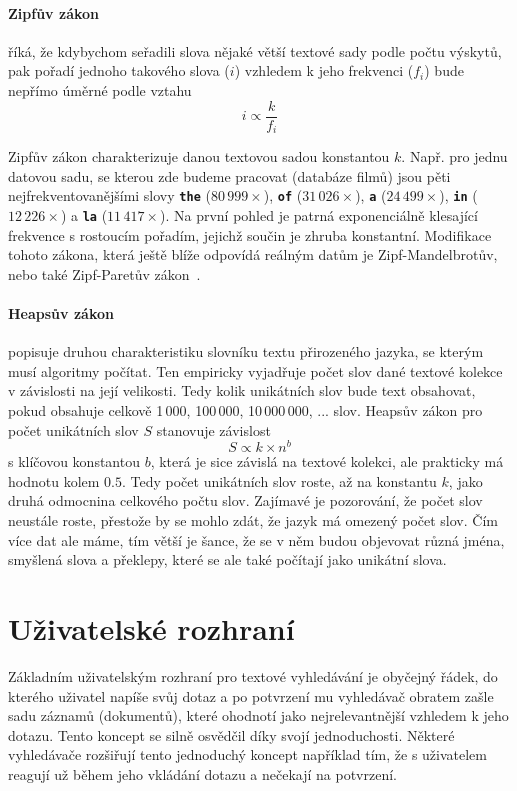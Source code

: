 \documentclass[11pt,letterpaper,oneside,openright]{book}
\newcommand{\bftt}[1]{\texttt{\textbf{#1}}}
\begin{document}
\paragraph{Zipfův zákon} říká, že kdybychom seřadili slova nějaké větší textové
sady podle počtu výskytů, pak pořadí jednoho takového slova ($i$) vzhledem k
jeho frekvenci ($f_i$) bude nepřímo úměrné podle vztahu \[i \propto
\frac{k}{f_i}\]

Zipfův zákon charakterizuje danou textovou sadou konstantou
$k$. Např. pro jednu datovou sadu, se kterou zde budeme pracovat (databáze
filmů) jsou pěti nejfrekventovanějšími slovy \bftt{the} ($80\,999\times$),
\bftt{of} ($31\,026\times$), \bftt{a} ($24\,499\times$), \bftt{in} ($12\,226
\times$) a \bftt{la} ($11\,417\times$). Na první pohled je patrná exponenciálně
klesající frekvence s rostoucím pořadím, jejichž součin je zhruba konstantní.
Modifikace tohoto zákona, která ještě blíže odpovídá reálným datům je
Zipf-Mandelbrotův, nebo také Zipf-Paretův zákon~\cite{neumann_zipf}.

\paragraph{Heapsův zákon} popisuje druhou charakteristiku slovníku textu
přirozeného jazyka, se kterým musí algoritmy počítat. Ten empiricky vyjadřuje
počet slov dané textové kolekce v závislosti na její velikosti. Tedy kolik
unikátních slov bude text obsahovat, pokud obsahuje celkově 1\,000, 100\,000,
10\,000\,000, ... slov. Heapsův zákon pro počet unikátních slov $S$ stanovuje
závislost \[S \propto k \times n^b\] s klíčovou konstantou $b$, která je sice
závislá na textové kolekci, ale prakticky má hodnotu kolem $0.5$.  Tedy počet
unikátních slov roste, až na konstantu $k$, jako druhá odmocnina celkového
počtu slov.  Zajímavé je pozorování, že počet slov neustále roste, přestože by
se mohlo zdát, že jazyk má omezený počet slov. Čím více dat ale máme, tím větší
je šance, že se v něm budou objevovat různá jména, smyšlená slova a překlepy,
které se ale také počítají jako unikátní slova.

\section{Uživatelské rozhraní} \label{sec:uzivatelske_rozhrani}
Základním uživatelským rozhraní pro textové vyhledávání je obyčejný řádek, do
kterého uživatel napíše svůj dotaz a po potvrzení mu vyhledávač obratem zašle
sadu záznamů (dokumentů), které ohodnotí jako nejrelevantnější vzhledem k jeho
dotazu.  Tento koncept se silně osvědčil díky svojí jednoduchosti. Některé
vyhledávače rozšiřují tento jednoduchý koncept například tím, že s uživatelem
reagují už během jeho vkládání dotazu a nečekají na potvrzení.
\end{document}
